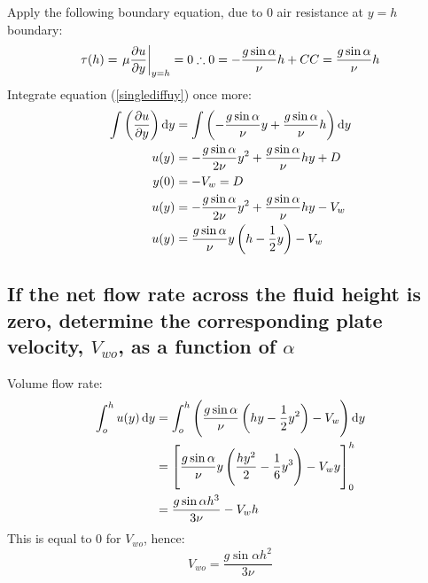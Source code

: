 \documentclass[class=report, crop=false, 12pt,a4paper]{standalone}
\begin{document}
Apply the following boundary equation, due to 0 air resistance at $y=h$ boundary:
\begin{equation}
  \tau(h) = \left. \mu \frac{\partial u}{\partial y} \right|_{y=h} = 0 \\
  \therefore 0 = -\frac{g\sin{\alpha}}{\nu}h + C\\
  C = \frac{g\sin{\alpha}}{\nu}h \label{singlediffuy}
\end{equation}
Integrate equation (\ref{singlediffuy}) once more:
\begin{align}
  \int \left( \frac{\partial u}{\partial y} \right)\dif y &= \int \left( -\frac{g\sin{\alpha}}{\nu}y + \frac{g\sin{\alpha}}{\nu}h \right)\dif y \\
  u(y) &= -\frac{g\sin{\alpha}}{2\nu}y^2 + \frac{g\sin{\alpha}}{\nu}hy + D\\
  y(0) &= -V_w = D\\
  u(y) &= -\frac{g\sin{\alpha}}{2\nu}y^2 + \frac{g\sin{\alpha}}{\nu}hy - V_w\\
  u(y) &= \frac{g\sin{\alpha}}{\nu}y \left(h - \frac{1}{2}y\right) - V_w
\end{align}
\subsection{If the net flow rate across the fluid height is zero, determine the corresponding plate velocity, $V_{wo}$, as a function of $\alpha$}
Volume flow rate:
\begin{align}
  \int_o^h u(y)\dif y &= \int_o^h \left( \frac{g\sin{\alpha}}{\nu} \left(hy - \frac{1}{2}y^2\right) - V_w \right) \dif y\\
  &= \left[ \frac{g\sin{\alpha}}{\nu}y \left(\frac{hy^2}{2} - \frac{1}{6}y^3\right) - V_wy \right]_0^h\\
  &= \frac{g\sin{\alpha} h^3}{3\nu} - V_wh
\end{align}
This is equal to 0 for $V_{wo}$, hence:
\begin{equation}
  V_{wo} = \frac{g\sin{\alpha}h^2}{3\nu}
\end{equation}
\end{document}

